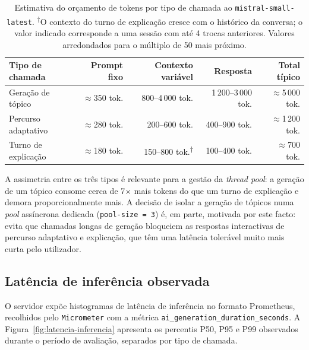 \begin{table}[h]
    \centering
    \small
    \begin{tabular}{p{3.4cm} r r r r}
        \toprule
        \textbf{Tipo de chamada} &
        \textbf{Prompt fixo} &
        \textbf{Contexto variável} &
        \textbf{Resposta} &
        \textbf{Total típico} \\
        \midrule
        Geração de tópico
            & $\approx$350 tok.
            & 800--4\,000 tok.
            & 1\,200--3\,000 tok.
            & $\approx$5\,000 tok. \\
        Percurso adaptativo
            & $\approx$280 tok.
            & 200--600 tok.
            & 400--900 tok.
            & $\approx$1\,200 tok. \\
        Turno de explicação
            & $\approx$180 tok.
            & 150--800 tok.\textsuperscript{†}
            & 100--400 tok.
            & $\approx$700 tok. \\
        \bottomrule
    \end{tabular}
    \caption[Orçamento de tokens por tipo de chamada ao LLM]{Estimativa do orçamento de tokens por tipo de chamada ao \texttt{mistral-small-latest}. \textsuperscript{†}O contexto do turno de explicação cresce com o histórico da conversa; o valor indicado corresponde a uma sessão com até 4 trocas anteriores. Valores arredondados para o múltiplo de 50 mais próximo.}
    \label{tab:token-budget}
\end{table}

A assimetria entre os três tipos é relevante para a gestão da \emph{thread pool}: a geração de um tópico consome cerca de 7$\times$ mais tokens do que um turno de explicação e demora proporcionalmente mais. A decisão de isolar a geração de tópicos numa \emph{pool} assíncrona dedicada (\texttt{pool-size = 3}) é, em parte, motivada por este facto: evita que chamadas longas de geração bloqueiem as respostas interactivas de percurso adaptativo e explicação, que têm uma latência tolerável muito mais curta pelo utilizador.

\subsection{Latência de inferência observada}
\label{ssec:latencia-inferencia}

O servidor expõe histogramas de latência de inferência no formato Prometheus, recolhidos pelo \texttt{Micrometer} com a métrica \texttt{ai\_generation\_duration\_seconds}. A Figura~\ref{fig:latencia-inferencia} apresenta os percentis P50, P95 e P99 observados durante o período de avaliação, separados por tipo de chamada.

